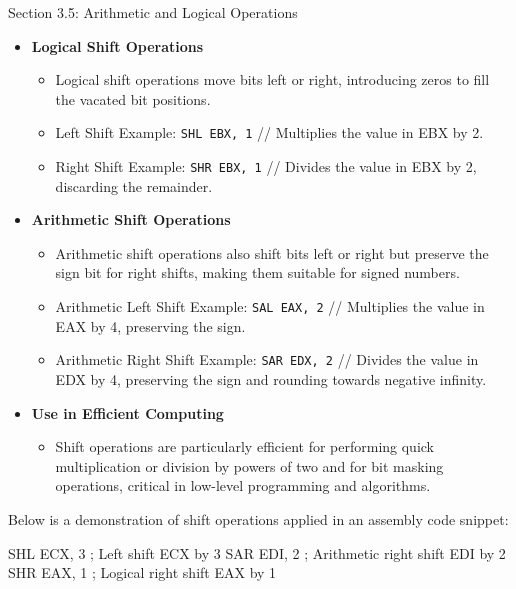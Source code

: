 \begin{notes}{Section 3.5: Arithmetic and Logical Operations}
    \begin{itemize}
        \item \textbf{Logical Shift Operations}
        \begin{itemize}
            \item Logical shift operations move bits left or right, introducing zeros to fill the vacated bit positions.
            \item Left Shift Example: \texttt{SHL EBX, 1} // Multiplies the value in EBX by 2.
            \item Right Shift Example: \texttt{SHR EBX, 1} // Divides the value in EBX by 2, discarding the remainder.
        \end{itemize}
        \item \textbf{Arithmetic Shift Operations}
        \begin{itemize}
            \item Arithmetic shift operations also shift bits left or right but preserve the sign bit for right shifts, making them suitable for signed numbers.
            \item Arithmetic Left Shift Example: \texttt{SAL EAX, 2} // Multiplies the value in EAX by 4, preserving the sign.
            \item Arithmetic Right Shift Example: \texttt{SAR EDX, 2} // Divides the value in EDX by 4, preserving the sign and rounding towards negative infinity.
        \end{itemize}
        \item \textbf{Use in Efficient Computing}
        \begin{itemize}
            \item Shift operations are particularly efficient for performing quick multiplication or division by powers of two and for bit masking operations, critical in low-level programming and algorithms.
        \end{itemize}
    \end{itemize}
    
    \begin{highlight}
        Below is a demonstration of shift operations applied in an assembly code snippet:
    
    \begin{code}[Assembly]
    SHL ECX, 3                ; Left shift ECX by 3
    SAR EDI, 2                ; Arithmetic right shift EDI by 2
    SHR EAX, 1                ; Logical right shift EAX by 1
    \end{code}
    

\end{highlight}
\end{notes}

